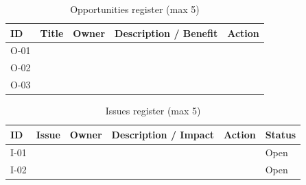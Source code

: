 \begin{table}[H]
    \centering
    \caption{Opportunities register (max 5)}
    \label{tab:opportunities}
    \begin{tabular}{C{0.7cm} L{3cm} L{2cm} L{5cm} L{3cm}}
        \toprule
        \textbf{ID} & \textbf{Title} & \textbf{Owner} & \textbf{Description / Benefit} & \textbf{Action} \\
        \midrule
        O-01 & & & & \\
        O-02 & & & & \\
        O-03 & & & & \\
        \bottomrule
    \end{tabular}
\end{table}

\begin{table}[H]
    \centering
    \caption{Issues register (max 5)}
    \label{tab:issues}
    \begin{tabular}{C{0.7cm} L{3cm} L{2cm} L{4cm} L{3cm} L{1.5cm}}
        \toprule
        \textbf{ID} & \textbf{Issue} & \textbf{Owner} & \textbf{Description / Impact} & \textbf{Action} & \textbf{Status} \\
        \midrule
        I-01 & & & & & Open \\
        I-02 & & & & & Open \\
        \bottomrule
    \end{tabular}
\end{table}
